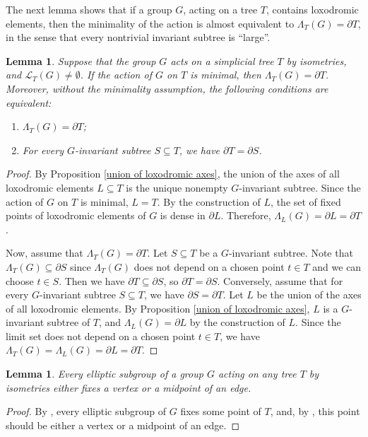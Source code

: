 \documentclass[11pt,letterpaper]{article}
\newtheorem{lem}[thm]{Lemma}
\theoremstyle{definition}
\theoremstyle{remark}
\begin{document}
The next lemma shows that if a group $G$, acting on a tree $T$, contains loxodromic elements, then the minimality of the action is almost equivalent to $\Lambda_T(G) = \partial T$, in the sense that every nontrivial invariant subtree is ``large''.

\begin{lem}\label{limit set is the whole boundary}
Suppose that the group $G$ acts on a simplicial tree $T$ by isometries, and $\mathcal{L}_T(G) \neq \emptyset$. If the action of $G$ on $T$ is minimal, then $\Lambda_T(G) =\partial T$.
Moreover, without the minimality assumption, the following conditions are equivalent:
\begin{enumerate}
\item $\Lambda_T(G) = \partial T$;
\item For every $G$-invariant subtree $S \subseteq T$, we have $\partial T = \partial S$.
\end{enumerate}
\end{lem} 
\begin{proof}
By Proposition \ref{union of loxodromic axes}, the union of the axes of all loxodromic elements $L\subseteq T$ is the unique nonempty $G$-invariant subtree. Since the action of $G$ on $T$ is minimal,  $L=T$. By the construction of $L$, the set of fixed points of loxodromic elements of $G$ is dense in $\partial L$. Therefore, $\Lambda_L(G)=\partial L=\partial T$. 

Now, assume that $\Lambda_T(G) = \partial T$. Let $S \subseteq T$ be a $G$-invariant subtree. Note that $\Lambda_T(G) \subseteq \partial S$ since $\Lambda_T(G)$ does not depend on a chosen point $t \in T$ and we can choose $t \in S$. Then we have $\partial T \subseteq \partial S$, so $\partial T =\partial S$. Conversely, assume that for every $G$-invariant subtree $S \subseteq T$, we have $\partial S = \partial T$. Let $L$ be the
union of the axes of all loxodromic elements. By Proposition \ref{union of loxodromic axes}, $L$ is a $G$-invariant subtree of $T$, and $\Lambda_L(G)=\partial L$ by the construction of $L$. Since the limit set does not depend on a chosen point $t \in T$, we have $\Lambda_T(G)=\Lambda_L(G)=\partial L = \partial T$. 
\end{proof}


\begin{lem}\label{fixed point in a tree}
 Every elliptic subgroup of a group $G$ acting on any tree $T$ by isometries either fixes a vertex or a midpoint of an edge.
\end{lem}
\begin{proof}
By \cite[Chapter 3.b, Proposition 9]{HV}, every elliptic subgroup of $G$ fixes some point of $T$, and, by \cite[Proposition 7.2]{Bas}, this point should be either a vertex or a midpoint of an edge.
\end{proof}
\end{document}

